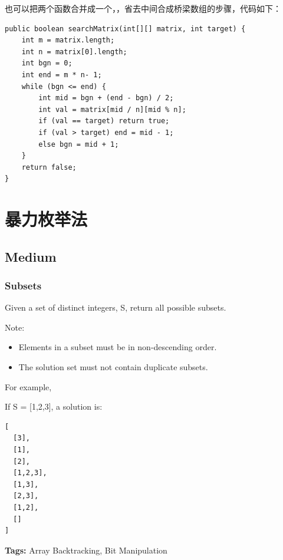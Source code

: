 \documentclass[12pt]{book}
\begin{document}
也可以把两个函数合并成一个，，省去中间合成桥梁数组的步骤，代码如下： 
\lstset{language=java,label= ,caption= ,numbers=none}
\begin{lstlisting}
public boolean searchMatrix(int[][] matrix, int target) {
    int m = matrix.length;
    int n = matrix[0].length;
    int bgn = 0;
    int end = m * n- 1;
    while (bgn <= end) {
        int mid = bgn + (end - bgn) / 2;
        int val = matrix[mid / n][mid % n];
        if (val == target) return true;
        if (val > target) end = mid - 1;
        else bgn = mid + 1;
    }
    return false;
}
\end{lstlisting}

\chapter{暴力枚举法}
\label{sec-9}
\section{Medium}
\label{sec-9-1}
\subsection{Subsets}
\label{sec-9-1-1}
Given a set of distinct integers, S, return all possible subsets.

Note:
\begin{itemize}
\item Elements in a subset must be in non-descending order.
\item The solution set must not contain duplicate subsets.
\end{itemize}
For example,

If S = [1,2,3], a solution is:
\lstset{language=java,label= ,caption= ,numbers=none}
\begin{lstlisting}
[
  [3],
  [1],
  [2],
  [1,2,3],
  [1,3],
  [2,3],
  [1,2],
  []
]
\end{lstlisting}

\textbf{Tags:} Array Backtracking, Bit Manipulation
\end{document}
